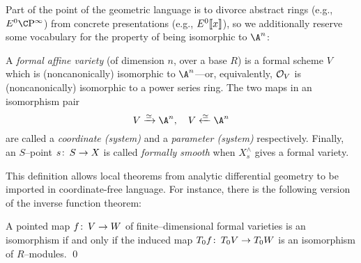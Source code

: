 Part of the point of the geometric language is to divorce abstract rings (e.g., \(E^0 \CP^\infty\)) from concrete presentations (e.g., \(E^0\llbracket{x}\rrbracket\)), so we additionally reserve some vocabulary for the property of being isomorphic to \(\A^n\):
\begin{definition}\label{DefnFormalVariety}
A \textit{formal affine variety} (of dimension \(n\), over a base \(R\)) is a formal scheme \(V\) which is (noncanonically) isomorphic to \(\A^n\)---or, equivalently, \(\mathcal{O}_V\) is (noncanonically) isomorphic to a power series ring.  The two maps in an isomorphism pair \[V \xrightarrow{\simeq} \A^n, \quad V \xleftarrow{\simeq} \A^n\] are called a \textit{coordinate (system)} and a \textit{parameter (system)} respectively.  Finally, an \(S\)--point \(s\colon\thinspace S \to X\) is called \textit{formally smooth} when \(X^\wedge_s\) gives a formal variety.
\end{definition}

This definition allows local theorems from analytic differential geometry to be imported in coordinate-free language.  For instance, there is the following version of the inverse function theorem:
\begin{theorem}\label{InverseFunctionTheoremForFVars}
A pointed map \(f\colon\thinspace V \to W\) of finite--dimensional formal varieties is an isomorphism if and only if the induced map \(T_0 f\colon\thinspace T_0 V \to T_0 W\) is an isomorphism of \(R\)--modules. \qed
\end{theorem}

